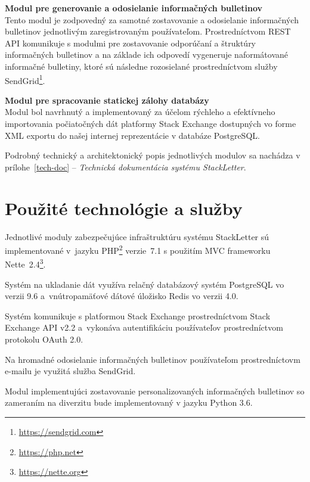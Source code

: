 \textbf{Modul pre generovanie a odosielanie informačných bulletinov}\\
Tento modul je zodpovedný za samotné zostavovanie a odosielanie informačných bulletinov jednotlivým zaregistrovaným
používateľom. Prostredníctvom REST API komunikuje s modulmi pre zostavovanie odporúčaní a štruktúry informačných bulletinov
a na základe ich odpovedí vygeneruje naformátované informačné bulletiny, ktoré sú následne rozosielané prostredníctvom služby
SendGrid\footnote{\url{https://sendgrid.com}}.

\textbf{Modul pre spracovanie statickej zálohy databázy}\\
Modul bol navrhnutý a implementovaný za účelom rýchleho a efektívneho importovania počiatočných dát platformy Stack Exchange
dostupných vo forme XML exportu do našej internej reprezentácie v databáze PostgreSQL.

Podrobný technický a architektonický popis jednotlivých modulov sa nachádza
v prílohe~\ref{tech-doc} -- \textit{Technická dokumentácia systému StackLetter}.

\section{Použité technológie a služby}

\begin{my_itemize}
\item{Jednotlivé moduly zabezpečujúce infraštruktúru systému StackLetter sú implementované v~jazyku PHP\footnote{\url{https://php.net}}
verzie~7.1 s použitím MVC frameworku Nette~2.4\footnote{\url{https://nette.org}}.}
\item{Systém na ukladanie dát využíva relačný databázový systém PostgreSQL vo verzii 9.6 a~vnútropamäťové dátové úložisko Redis
vo verzii 4.0.}
\item{Systém komunikuje s platformou Stack Exchange prostredníctvom Stack Exchange API v2.2 a~vykonáva autentifikáciu
používateľov prostredníctvom protokolu OAuth 2.0.}
\item{Na hromadné odosielanie informačných bulletinov používateľom prostredníctovm e-mailu je využitá služba SendGrid.}
\item{Modul implementujúci zostavovanie personalizovaných informačných bulletinov so zameraním na diverzitu bude implementovaný
v jazyku Python 3.6.}
\end{my_itemize}
